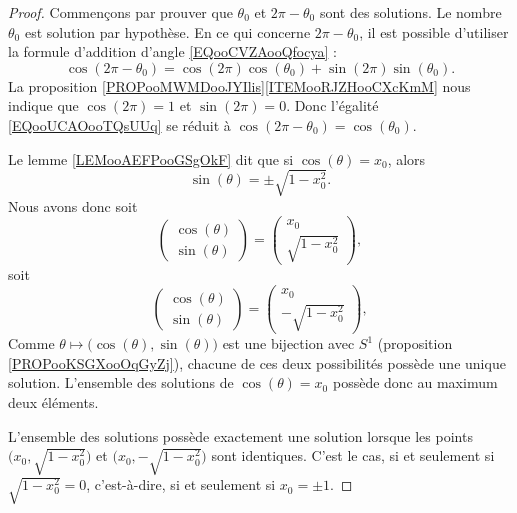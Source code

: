 \begin{proof}
	Commençons par prouver que \( \theta_0\) et \( 2\pi-\theta_0\) sont des solutions. Le nombre \( \theta_0\) est solution par hypothèse. En ce qui concerne \( 2\pi-\theta_0\), il est possible d'utiliser la formule d'addition d'angle \eqref{EQooCVZAooQfocya} :
	\begin{equation}        \label{EQooUCAOooTQsUUq}
		\cos(2\pi-\theta_0)=\cos(2\pi)\cos(\theta_0)+\sin(2\pi)\sin(\theta_0).
	\end{equation}
	La proposition \ref{PROPooMWMDooJYIlis}\ref{ITEMooRJZHooCXcKmM} nous indique que \( \cos(2\pi)=1\) et \( \sin(2\pi)=0\). Donc l'égalité \eqref{EQooUCAOooTQsUUq} se réduit à \( \cos(2\pi -\theta_0)=\cos(\theta_0)\).

	Le lemme \ref{LEMooAEFPooGSgOkF} dit que si \( \cos(\theta)=x_0\), alors
	\begin{equation}
		\sin(\theta)=\pm\sqrt{ 1-x_0^2 }.
	\end{equation}
	Nous avons donc soit
	\begin{equation}
		\begin{pmatrix}
			\cos(\theta) \\
			\sin(\theta)
		\end{pmatrix}=\begin{pmatrix}
			x_0 \\
			\sqrt{ 1-x_0^2 }
		\end{pmatrix},
	\end{equation}
	soit
	\begin{equation}
		\begin{pmatrix}
			\cos(\theta) \\
			\sin(\theta)
		\end{pmatrix}=\begin{pmatrix}
			x_0 \\
			-\sqrt{ 1-x_0^2 }
		\end{pmatrix},
	\end{equation}
	Comme \( \theta\mapsto\big( \cos(\theta),\sin(\theta) \big)\) est une bijection avec \( S^1\) (proposition \ref{PROPooKSGXooOqGyZj}), chacune de ces deux possibilités possède une unique solution. L'ensemble des solutions de \( \cos(\theta)=x_0\) possède donc au maximum deux éléments.

	L'ensemble des solutions possède exactement une solution lorsque les points \( \big( x_0,\sqrt{ 1-x_0^2 } \big)\) et \( \big( x_0,-\sqrt{ 1-x_0^2 } \big)\) sont identiques. C'est le cas, si et seulement si \( \sqrt{ 1-x_0^2 }=0\), c'est-à-dire, si et seulement si \( x_0=\pm 1\).
\end{proof}

